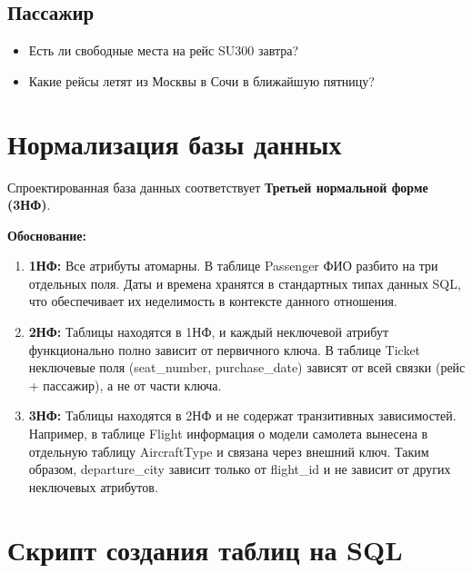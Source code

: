 \documentclass[a4paper,12pt]{article}
\begin{document}
\subsection{Пассажир}
\begin{itemize}
    \item Есть ли свободные места на рейс SU300 завтра?
    \item Какие рейсы летят из Москвы в Сочи в ближайшую пятницу?
\end{itemize}

\section{Нормализация базы данных}

Спроектированная база данных соответствует \textbf{Третьей нормальной форме (3НФ)}.

\textbf{Обоснование:}
\begin{enumerate}
    \item \textbf{1НФ:} Все атрибуты атомарны. В таблице Passenger ФИО разбито на три отдельных поля. Даты и времена хранятся в стандартных типах данных SQL, что обеспечивает их неделимость в контексте данного отношения.
    
    \item \textbf{2НФ:} Таблицы находятся в 1НФ, и каждый неключевой атрибут функционально полно зависит от первичного ключа. В таблице Ticket неключевые поля (seat\_number, purchase\_date) зависят от всей связки (рейс + пассажир), а не от части ключа.
    
    \item \textbf{3НФ:} Таблицы находятся в 2НФ и не содержат транзитивных зависимостей. Например, в таблице Flight информация о модели самолета вынесена в отдельную таблицу AircraftType и связана через внешний ключ. Таким образом, departure\_city зависит только от flight\_id и не зависит от других неключевых атрибутов.
\end{enumerate}

\section{Скрипт создания таблиц на SQL}
\end{document}
